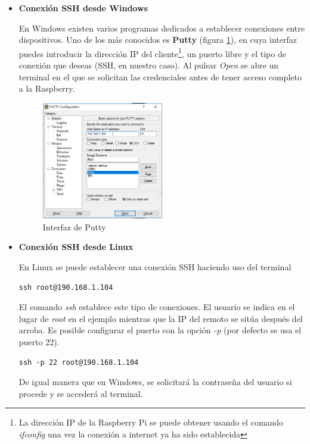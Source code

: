 \begin{itemize}
\item \textbf{Conexión SSH desde Windows}

En Windows existen varios programas dedicados a establecer conexiones entre dispositivos. Uno de los más conocidos es \textbf{Putty} (figura \ref{fig:putty}), en cuya interfaz puedes introducir la dirección IP del cliente\footnote{La dirección IP de la Raspberry Pi se puede obtener usando el comando \textit{ifconfig} una vez la conexión a internet ya ha sido establecida}, un puerto libre y el tipo de conexión que deseas (SSH, en nuestro caso). Al pulsar \textit{Open} se abre un terminal en el que se solicitan las credenciales antes de tener acceso completo a la Raspberry.

\begin{figure}[tb]
\centering
\includegraphics[width=0.5\textwidth]{figuras/Putty.png}
\caption{Interfaz de Putty}
\label{fig:putty}
\end{figure}

\item \textbf{Conexión SSH desde Linux}

En Linux se puede establecer una conexión SSH haciendo uso del terminal

\begin{lstlisting}[frame=single, label=command:ssh]
ssh root@190.168.1.104
\end{lstlisting}

El comando \textit{ssh} establece este tipo de conexiones. El usuario se indica en el lugar de \textit{root} en el ejemplo mientras que la IP del remoto se sitúa después del arroba. Es posible configurar el puerto con la opción \textit{-p} (por defecto se usa el puerto 22).

\begin{lstlisting}[frame=single, label=command:ssh-p]
ssh -p 22 root@190.168.1.104
\end{lstlisting}

De igual manera que en Windows, se solicitará la contraseña del usuario si procede y se accederá al terminal.

\end{itemize}

